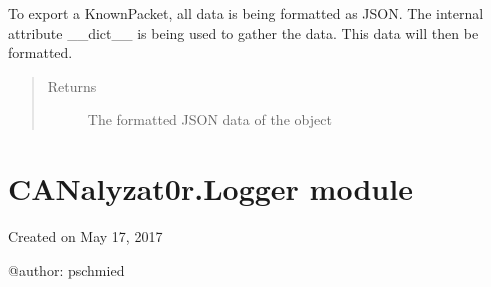 \documentclass[letterpaper,10pt,english]{sphinxmanual}
\begin{document}
\begin{fulllineitems}
\begin{fulllineitems}
\begin{quote}
\begin{description}
\end{description}\end{quote}

\end{fulllineitems}


\begin{fulllineitems}
\label{\detokenize{src:src.KnownPacket.KnownPacket.toJSON}}
To export a KnownPacket, all data is being formatted as JSON.
The internal attribute \_\_dict\_\_ is being used to gather the data.
This data will then be formatted.
\begin{quote}\begin{description}
\item[{Returns}] \leavevmode
The formatted JSON data of the object

\end{description}\end{quote}

\end{fulllineitems}


\end{fulllineitems}



\section{CANalyzat0r.Logger module}
\label{\detokenize{src:module-src.Logger}}\label{\detokenize{src:canalyzat0r-logger-module}}
Created on May 17, 2017

@author: pschmied
\end{document}
